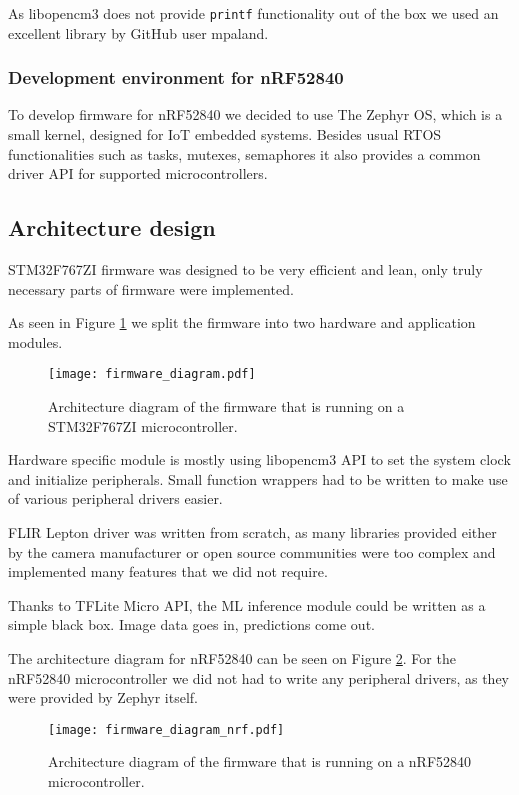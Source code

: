 As libopencm3 does not provide \verb|printf| functionality out of the box we used an excellent library by GitHub user mpaland\cite{printf_lib}.


\subsubsection{ Development environment for nRF52840}

To develop firmware for nRF52840 we decided to use The Zephyr OS, which is a small kernel, designed for IoT embedded systems.
Besides usual RTOS functionalities such as tasks, mutexes, semaphores it also provides a common driver API for supported microcontrollers.


\subsection{ Architecture design}

STM32F767ZI firmware was designed to be very efficient and lean, only truly necessary parts of firmware were implemented.

As seen in Figure \ref{firmware_diagram} we split the firmware into two hardware and application modules.

\begin{figure}[ht]
        \centering
        \texttt{[image: firmware\_diagram.pdf]} 
        \caption{ Architecture diagram of the firmware that is running on a STM32F767ZI microcontroller.} 
        \label{firmware_diagram}
\end{figure}

Hardware specific module is mostly using libopencm3 API to set the system clock and initialize peripherals.
Small function wrappers had to be written to make use of various peripheral drivers easier.

FLIR Lepton driver was written from scratch, as many libraries provided either by the camera manufacturer or open source communities were too complex and implemented many features that we did not require.

Thanks to TFLite Micro API, the ML inference module could be written as a simple black box.
Image data goes in, predictions come out.

The architecture diagram for nRF52840 can be seen on Figure \ref{firmware_diagram_wisent}.
For the nRF52840 microcontroller we did not had to write any peripheral drivers, as they were provided by Zephyr itself.

\begin{figure}[ht]
        \centering
        \texttt{[image: firmware\_diagram\_nrf.pdf]} 
        \caption{ Architecture diagram of the firmware that is running on a nRF52840 microcontroller.} 
        \label{firmware_diagram_wisent}
\end{figure}

